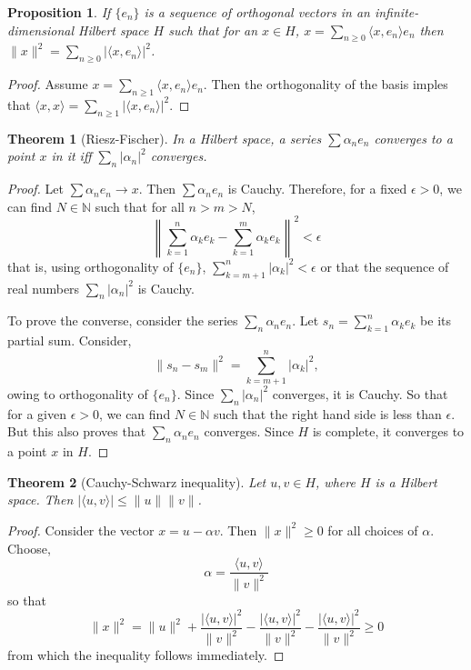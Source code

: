 \documentclass{article}
\theoremstyle{plain}
\newtheorem{thm}{Theorem}
\numberwithin{thm}{section}
\theoremstyle{plain}
\newtheorem{prop}{Proposition}
\numberwithin{prop}{section}
\theoremstyle{definition}
\numberwithin{defn}{section}
\theoremstyle{remark}
\numberwithin{equation}{section}
\begin{document}
\begin{prop}\label{s3p3}
If $\{e_n\}$ is a sequence of orthogonal vectors in an infinite-dimensional
Hilbert space $H$ such that for an $x \in H$, $x = \sum_{n \ge 0}
\langle x, e_n\rangle e_n$ then $\lVert x \rVert^2 = \sum_{n \ge 0}
|\langle x, e_n\rangle|^2$.
\end{prop}
\begin{proof}
Assume $x = \sum_{n \ge 1}\langle x, e_n\rangle e_n$. Then the orthogonality
of the basis imples that $\langle x, x\rangle = \sum_{n \ge 1}|\langle x, e_n
\rangle|^2$.
\end{proof}

\begin{thm}[Riesz-Fischer]\label{s3t4}
In a Hilbert space, a series $\sum \alpha_n e_n$ converges to a point $x$ in it
iff $\sum_n |\alpha_n|^2$ converges.
\end{thm}
\begin{proof}
Let $\sum \alpha_n e_n \rightarrow x$. Then $\sum \alpha_n e_n$ is Cauchy.
Therefore, for a fixed $\epsilon > 0$, we can find $N \in \mathbb{N}$ such that
for all $n > m > N$,
\[
\left\lVert \sum_{k=1}^n \alpha_k e_k - \sum_{k=1}^m \alpha_k e_k\right\rVert^2
< \epsilon
\]
that is, using orthogonality of $\{e_n\}$, $\sum_{k=m+1}^n|\alpha_k|^2<\epsilon$
or that the sequence of real numbers $\sum_n|\alpha_n|^2$ is Cauchy.

To prove the converse, consider the series $\sum_n \alpha_n e_n$. Let $s_n = 
\sum_{k=1}^n \alpha_k e_k$ be its partial sum. Consider,
\[
\lVert s_n - s_m \rVert^2 = \sum_{k=m+1}^n |\alpha_k|^2,
\]
owing to orthogonality of $\{e_n\}$. Since $\sum_n |\alpha_n|^2$ converges, it 
is Cauchy. So that for a given $\epsilon > 0$, we can find $N \in \mathbb{N}$
such that the right hand side is less than $\epsilon$. But this also proves 
that $\sum_n \alpha_n e_n$ converges. Since $H$ is complete, it converges to
a point $x$ in $H$.
\end{proof}

\begin{thm}[Cauchy-Schwarz inequality]\label{c3t5}
Let $u, v \in H$, where $H$ is a Hilbert space. Then $|\langle u, v\rangle| \le
\lVert u \rVert\lVert v \rVert$.
\end{thm}
\begin{proof}
Consider the vector $x = u - \alpha v$. Then $\lVert x \rVert^2 \ge 0$ for all
choices of $\alpha$. Choose,
\[
\alpha = \frac{\langle u, v \rangle}{\lVert v \rVert^2}
\]
so that
\[
\lVert x \rVert^2 = \lVert u \rVert^2 + \frac{|\langle u, v\rangle|^2}
{\lVert v \rVert^2} - \frac{|\langle u, v\rangle|^2}{\lVert v \rVert^2} 
 - \frac{|\langle u, v\rangle|^2}{\lVert v \rVert^2} \ge 0
\]
from which the inequality follows immediately.
\end{proof}
\end{document}
